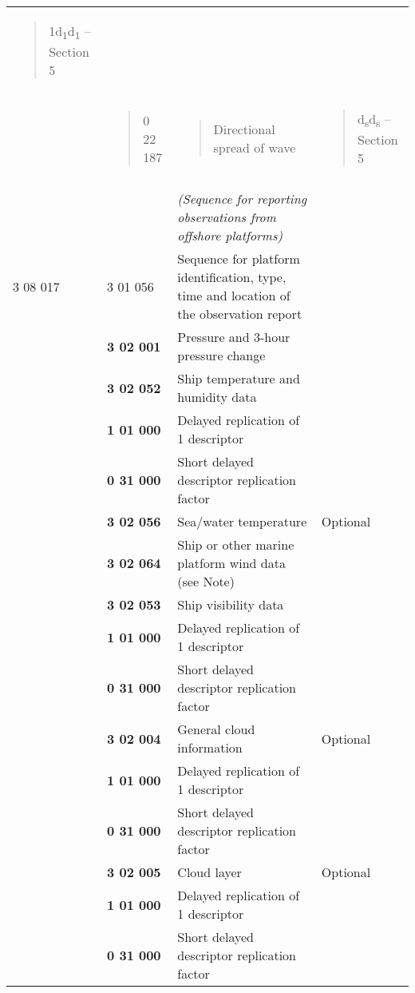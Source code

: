 \begin{longtable}[]{@{}llll@{}}
\begin{minipage}[t]{0.22\columnwidth}
\begin{quote}
1d\textsubscript{1}d\textsubscript{1} -- Section 5
\end{quote}\strut
\end{minipage}\tabularnewline
\begin{minipage}[t]{0.22\columnwidth}\raggedright
\strut
\end{minipage} & \begin{minipage}[t]{0.22\columnwidth}\raggedright
\begin{quote}
0 22 187
\end{quote}\strut
\end{minipage} & \begin{minipage}[t]{0.22\columnwidth}\raggedright
\begin{quote}
Directional spread of wave
\end{quote}\strut
\end{minipage} & \begin{minipage}[t]{0.22\columnwidth}\raggedright
\begin{quote}
d\textsubscript{s}d\textsubscript{s} -- Section 5
\end{quote}\strut
\end{minipage}\tabularnewline
& & &\tabularnewline
& & \emph{(Sequence for reporting observations from offshore platforms)} &\tabularnewline
3 08 017 & 3 01 056 & Sequence for platform identification, type, time and location of the observation report &\tabularnewline
& \textbf{3 02 001} & Pressure and 3-hour pressure change &\tabularnewline
& \textbf{3 02 052} & Ship temperature and humidity data &\tabularnewline
& \textbf{1 01 000} & Delayed replication of 1 descriptor &\tabularnewline
& \textbf{0 31 000} & Short delayed descriptor replication factor &\tabularnewline
& \textbf{3 02 056} & Sea/water temperature & Optional\tabularnewline
& \textbf{3 02 064} & Ship or other marine platform wind data (see Note) &\tabularnewline
& \textbf{3 02 053} & Ship visibility data &\tabularnewline
& \textbf{1 01 000} & Delayed replication of 1 descriptor &\tabularnewline
& \textbf{0 31 000} & Short delayed descriptor replication factor &\tabularnewline
& \textbf{3 02 004} & General cloud information & Optional\tabularnewline
& \textbf{1 01 000} & Delayed replication of 1 descriptor &\tabularnewline
& \textbf{0 31 000} & Short delayed descriptor replication factor &\tabularnewline
& \textbf{3 02 005} & Cloud layer & Optional\tabularnewline
& \textbf{1 01 000} & Delayed replication of 1 descriptor &\tabularnewline
& \textbf{0 31 000} & Short delayed descriptor replication factor &\tabularnewline

\end{longtable}
